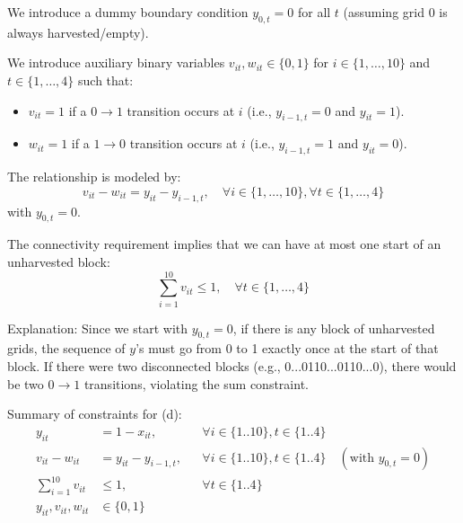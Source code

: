 \documentclass{article}
\begin{document}
\begin{enumerate}
\begin{enumerate}
We introduce a dummy boundary condition $y_{0,t} = 0$ for all $t$ (assuming grid 0 is always harvested/empty).

We introduce auxiliary binary variables $v_{it}, w_{it} \in \{0,1\}$ for $i \in \{1, \ldots, 10\}$ and $t \in \{1, \ldots, 4\}$ such that:
\begin{itemize}
    \item $v_{it} = 1$ if a $0 \to 1$ transition occurs at $i$ (i.e., $y_{i-1,t}=0$ and $y_{it}=1$).
    \item $w_{it} = 1$ if a $1 \to 0$ transition occurs at $i$ (i.e., $y_{i-1,t}=1$ and $y_{it}=0$).
\end{itemize}

The relationship is modeled by:
\[
v_{it} - w_{it} = y_{it} - y_{i-1,t}, \quad \forall i \in \{1, \ldots, 10\}, \forall t \in \{1, \ldots, 4\}
\]
with $y_{0,t} = 0$.

The connectivity requirement implies that we can have at most one start of an unharvested block:
\[
\sum_{i=1}^{10} v_{it} \leq 1, \quad \forall t \in \{1, \ldots, 4\}
\]

Explanation: Since we start with $y_{0,t}=0$, if there is any block of unharvested grids, the sequence of $y$'s must go from 0 to 1 exactly once at the start of that block. If there were two disconnected blocks (e.g., 0...0110...0110...0), there would be two $0 \to 1$ transitions, violating the sum constraint.

Summary of constraints for (d):
\begin{align*}
y_{it} &= 1 - x_{it}, && \forall i \in \{1..10\}, t \in \{1..4\} \\
v_{it} - w_{it} &= y_{it} - y_{i-1,t}, && \forall i \in \{1..10\}, t \in \{1..4\} \quad (\text{with } y_{0,t}=0) \\
\sum_{i=1}^{10} v_{it} &\leq 1, && \forall t \in \{1..4\} \\
y_{it}, v_{it}, w_{it} &\in \{0,1\}
\end{align*}

\end{enumerate}



\end{enumerate}
\end{document}
